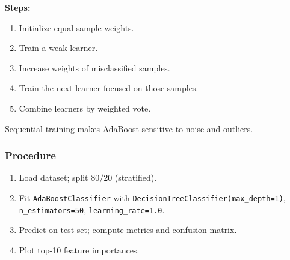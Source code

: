 \documentclass[a4paper,10pt]{article}
\begin{document}
\textbf{Steps:}
\begin{enumerate}[nosep]
    \item Initialize equal sample weights.
    \item Train a weak learner.
    \item Increase weights of misclassified samples.
    \item Train the next learner focused on those samples.
    \item Combine learners by weighted vote.
\end{enumerate}
Sequential training makes AdaBoost sensitive to noise and outliers.

\subsubsection{Procedure}
\begin{enumerate}[nosep]
    \item Load dataset; split 80/20 (stratified).
    \item Fit \texttt{AdaBoostClassifier} with \texttt{DecisionTreeClassifier(max\_depth=1)}, \texttt{n\_estimators=50}, \texttt{learning\_rate=1.0}.
    \item Predict on test set; compute metrics and confusion matrix.
    \item Plot top-10 feature importances.
\end{enumerate}
\end{document}

